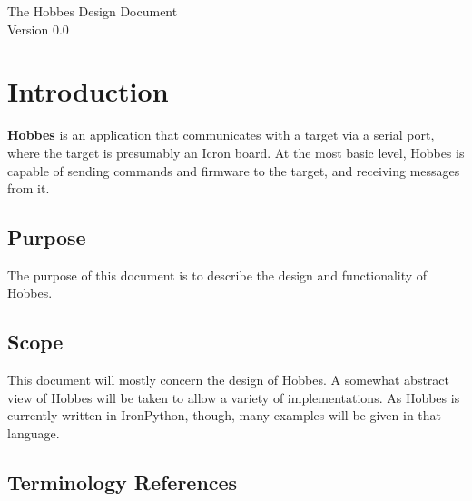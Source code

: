 \documentclass[12pt,letterpaper]{article}
\author{Angus Lim}
\begin{document}
\begin{center}

\huge The Hobbes Design Document \\ \large Version 0.0

\end{center}

\tableofcontents
\pagebreak

\setcounter{section}{-1}



%
%
\section{Introduction}
\label{0}

\textbf{Hobbes} is an application that communicates with a target via a serial port, where the target is presumably an Icron board. At the most basic level, Hobbes is capable of sending commands and firmware to the target, and receiving messages from it.

\setcounter{subsection}{-1}



%
%
\subsection{Purpose}
\label{0.0}

The purpose of this document is to describe the design and functionality of Hobbes.



%
%
\subsection{Scope}
\label{0.1}

This document will mostly concern the design of Hobbes. A somewhat abstract view of Hobbes will be taken to allow a variety of implementations. As Hobbes is currently written in IronPython, though, many examples will be given in that language.



%
%
\subsection{Terminology References}
\label{0.2}
\end{document}
